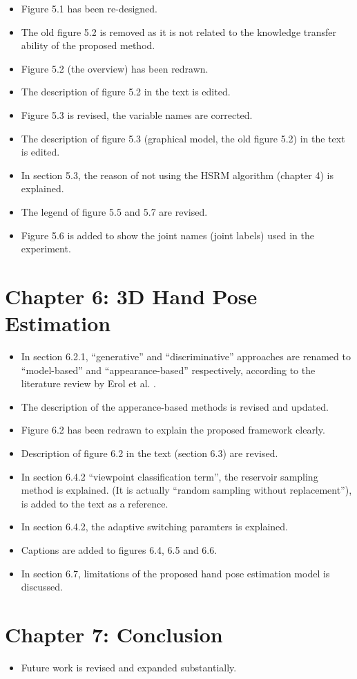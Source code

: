 \documentclass[10pt, a4paper]{article}
\begin{document}
\begin{itemize}
\item Figure 5.1 has been re-designed.
\item The old figure 5.2 is removed as it is not related to the knowledge transfer ability of the proposed method.
\item Figure 5.2 (the overview) has been redrawn.
\item The description of figure 5.2 in the text is edited.
\item Figure 5.3 is revised, the variable names are corrected.
\item The description of figure 5.3 (graphical model, the old figure 5.2) in the text is edited.
\item In section 5.3, the reason of not using the HSRM algorithm (chapter 4) is explained.
\item The legend of figure 5.5 and 5.7 are revised.
\item Figure 5.6 is added to show the joint names (joint labels) used in the experiment.
\end{itemize}

\section{Chapter 6: 3D Hand Pose Estimation} 

\begin{itemize}
\item In section 6.2.1, ``generative'' and ``discriminative'' approaches are renamed to ``model-based'' and ``appearance-based'' respectively, according to the literature review by Erol et al. \cite{Erol2007}.
\item The description of the apperance-based methods is revised and updated.  
\item Figure 6.2 has been redrawn to explain the proposed framework clearly.
\item Description of figure 6.2 in the text (section 6.3) are revised.
\item In section 6.4.2 ``viewpoint classification term'', the reservoir sampling method is explained. (It is actually ``random sampling without replacement''), \cite{Vitter1985} is added to the text as a reference.
\item In section 6.4.2, the adaptive switching paramters is explained. 
\item Captions are added to figures 6.4, 6.5 and 6.6.
\item In section 6.7, limitations of the proposed hand pose estimation model is discussed.
\end{itemize}

\section{Chapter 7: Conclusion}
\begin{itemize}
\item Future work is revised and expanded substantially. 
\end{itemize}


 
\end{document}
